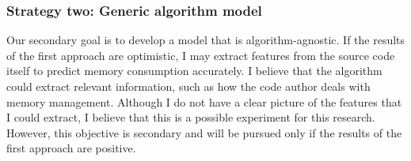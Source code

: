 \subsubsection{Strategy two: Generic algorithm model}
\label{subsubsec:generic-algorithm-model}

Our secondary goal is to develop a model that is algorithm-agnostic.
If the results of the first approach are optimistic, I may extract features from the source code itself to predict memory consumption accurately.
I believe that the algorithm could extract relevant information, such as how the code author deals with memory management.
Although I do not have a clear picture of the features that I could extract, I believe that this is a possible experiment for this research.
However, this objective is secondary and will be pursued only if the results of the first approach are positive.
